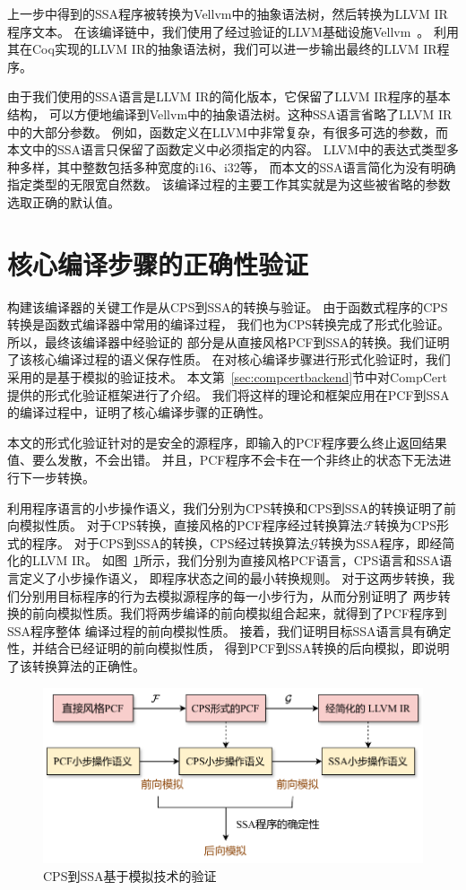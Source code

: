 上一步中得到的SSA程序被转换为Vellvm中的抽象语法树，然后转换为LLVM IR程序文本。
在该编译链中，我们使用了经过验证的LLVM基础设施Vellvm~\cite{zakowski2021modular}。
利用其在Coq实现的LLVM IR的抽象语法树，我们可以进一步输出最终的LLVM IR程序。

由于我们使用的SSA语言是LLVM IR的简化版本，它保留了LLVM IR程序的基本结构，
可以方便地编译到Vellvm中的抽象语法树。这种SSA语言省略了LLVM IR中的大部分参数。
例如，函数定义在LLVM中非常复杂，有很多可选的参数，而本文中的SSA语言只保留了函数定义中必须指定的内容。
LLVM中的表达式类型多种多样，其中整数包括多种宽度的i16、i32等，
而本文的SSA语言简化为没有明确指定类型的无限宽自然数。
该编译过程的主要工作其实就是为这些被省略的参数选取正确的默认值。

\section{核心编译步骤的正确性验证}

构建该编译器的关键工作是从CPS到SSA的转换与验证。
由于函数式程序的CPS转换是函数式编译器中常用的编译过程，
我们也为CPS转换完成了形式化验证。所以，最终该编译器中经验证的
部分是从直接风格PCF到SSA的转换。我们证明了该核心编译过程的语义保存性质。
在对核心编译步骤进行形式化验证时，我们采用的是基于模拟的验证技术。
本文第~\ref{sec:compcertbackend}节中对CompCert提供的形式化验证框架进行了介绍。
我们将这样的理论和框架应用在PCF到SSA的编译过程中，证明了核心编译步骤的正确性。

本文的形式化验证针对的是安全的源程序，即输入的PCF程序要么终止返回结果值、要么发散，不会出错。
并且，PCF程序不会卡在一个非终止的状态下无法进行下一步转换。

利用程序语言的小步操作语义，我们分别为CPS转换和CPS到SSA的转换证明了前向模拟性质。
对于CPS转换，直接风格的PCF程序经过转换算法$\mathcal{F}$转换为CPS形式的程序。
对于CPS到SSA的转换，CPS经过转换算法$\mathcal{G}$转换为SSA程序，即经简化的LLVM IR。
如图~\ref{extracts}所示，我们分别为直接风格PCF语言，CPS语言和SSA语言定义了小步操作语义，
即程序状态之间的最小转换规则。
对于这两步转换，我们分别用目标程序的行为去模拟源程序的每一小步行为，从而分别证明了
两步转换的前向模拟性质。我们将两步编译的前向模拟组合起来，就得到了PCF程序到SSA程序整体
编译过程的前向模拟性质。
接着，我们证明目标SSA语言具有确定性，并结合已经证明的前向模拟性质，
得到PCF到SSA转换的后向模拟，即说明了该转换算法的正确性。

\begin{figure}[htbp]
    \centering
    \vspace{2ex}
    \includegraphics[width=0.8\linewidth]{figures/extracts.drawio.pdf}
    \caption{CPS到SSA基于模拟技术的验证}\label{extracts}
\end{figure}

